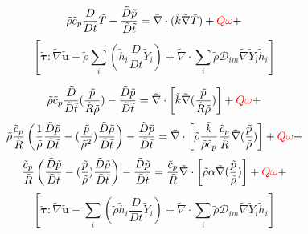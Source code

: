 \documentclass[preprint,12pt,authoryear]{elsarticle}
\begin{document}
{\color{red}
\[
         \tilde{\rho} \tilde{c}_{p}
        \frac{D}{Dt}
		\tilde{T}
		-
		 \frac{\tilde{D} \tilde{p}}{\tilde{D}\tilde{t}}
		=
		\tilde{\nabla} \cdot (\tilde{k}\tilde{\nabla} \tilde{T})
                +
        {\color{red} Q\omega}
        +
\]
\[
        \left[
        \pmb{\tilde{\tau}}:\tilde{\nabla} \tilde{\mathbf{u}} 
        -
         \tilde{\rho}
        \sum\limits_i
        \left(
                \tilde{h}_i
                \frac{D}{Dt}
		\tilde{Y}_i
		\right)
        +
        \tilde{\nabla} \cdot
        \sum\limits_i 
        \tilde{\rho}\mathcal{D}_{im}\tilde{\nabla}\tilde{Y}_i     
        \tilde{h}_i
        \right]
\]

\[
         \tilde{\rho} \tilde{c}_{p}
         \frac{\tilde{D} } {\tilde{D}\tilde{t}}
		(\frac{ \tilde{p} }{ \tilde{R} \tilde{\rho} } )
		-
		 \frac{\tilde{D} \tilde{p}}{\tilde{D}\tilde{t}}
		=
		\tilde{\nabla} \cdot 
		\left[\tilde{k}\tilde{\nabla} (\frac{ \tilde{p} }{ \tilde{R} \tilde{\rho} } )\right]
                +
        {\color{red} Q\omega}
        +
\]
\[
         \tilde{\rho} \frac{ \tilde{c}_{p} }{ \tilde{R} }
         \left(
         \frac{ 1 }{  \tilde{\rho} }
         \frac{\tilde{D}  \tilde{p}} {\tilde{D}\tilde{t}}
		-
		(\frac{ \tilde{p} }{  \tilde{\rho}^2 } )
		 \frac{\tilde{D}\tilde{\rho} } {\tilde{D}\tilde{t}}
		\right)
		-
		 \frac{\tilde{D} \tilde{p}}{\tilde{D}\tilde{t}}
		=
		\tilde{\nabla} \cdot
		\left[ \tilde{\rho} 
		       \frac{\tilde{k}}{\tilde{\rho} \tilde{c}_{p} }
		       \frac{\tilde{c}_{p}}{\tilde{R}}
		\tilde{\nabla} (\frac{ \tilde{p} }{  \tilde{\rho} } )\right]
                +
        {\color{red} Q\omega}
        +
\]
\[
          \frac{ \tilde{c}_{p} }{ \tilde{R} }
         \left(
         \frac{\tilde{D}  \tilde{p}} {\tilde{D}\tilde{t}}
		-
		(\frac{ \tilde{p} }{  \tilde{\rho} } )
		 \frac{\tilde{D}\tilde{\rho} } {\tilde{D}\tilde{t}}
		\right)
		-
		 \frac{\tilde{D} \tilde{p}}{\tilde{D}\tilde{t}}
		=
		\frac{\tilde{c}_{p}}{\tilde{R}}
		\tilde{\nabla} \cdot 
			\left[ \tilde{\rho} \alpha
		\tilde{\nabla} (\frac{ \tilde{p} }{  \tilde{\rho} } )\right]
                +
        {\color{red} Q\omega}
        +
\]
\[
        \left[
        \pmb{\tilde{\tau}}:\tilde{\nabla} \tilde{\mathbf{u}} 
        -
        \sum\limits_i
        \left(
                 \tilde{\rho}\tilde{h}_i
                \frac{D}{Dt}
		\tilde{Y}_i
		\right)
        +
        \tilde{\nabla} \cdot
        \sum\limits_i 
        \tilde{\rho}\mathcal{D}_{im}\tilde{\nabla}\tilde{Y}_i     
        \tilde{h}_i
        \right]
\]

}
\end{document}
